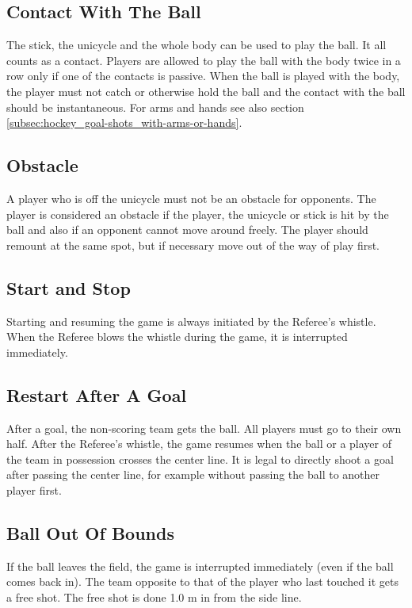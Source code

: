 \subsection{Contact With The Ball}
The stick, the unicycle and the whole body can be used to play the ball.
It all counts as a contact.
Players are allowed to play the ball with the body twice in a row only if one of the contacts is passive.
When the ball is played with the body, the player must not catch or otherwise hold the ball and the contact with the ball should be instantaneous.
For arms and hands see also section \ref{subsec:hockey_goal-shots_with-arms-or-hands}.

\subsection{Obstacle}
A player who is off the unicycle must not be an obstacle for opponents.
The player is considered an obstacle if the player, the unicycle or stick is hit by the ball and also if an opponent cannot move around freely.
The player should remount at the same spot, but if necessary move out of the way of play first.

\subsection{Start and Stop}
Starting and resuming the game is always initiated by the Referee's whistle.
When the Referee blows the whistle during the game, it is interrupted immediately.

\subsection{Restart After A Goal}
After a goal, the non-scoring team gets the ball.
All players must go to their own half.
After the Referee's whistle, the game resumes when the ball or a player of the team in possession crosses the center line.
It is legal to directly shoot a goal after passing the center line, for example without passing the ball to another player first.

\subsection{Ball Out Of Bounds}
If the ball leaves the field, the game is interrupted immediately (even if the ball comes back in).
The team opposite to that of the player who last touched it gets a free shot.
The free shot is done 1.0 m in from the side line.

